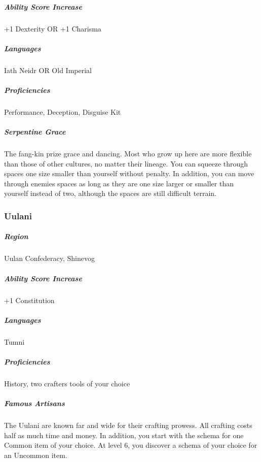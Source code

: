 \subparagraph*{Ability Score Increase} +1 Dexterity OR +1 Charisma

\subparagraph*{Languages} Iath Neidr OR Old Imperial

\subparagraph*{Proficiencies} Performance, Deception, Disguise Kit

\subparagraph*{Serpentine Grace} The fang-kin prize grace and dancing. Most who grow up here are more flexible than those of other cultures, no matter their lineage. You can squeeze through spaces one size smaller than yourself without penalty. In addition, you can move through enemies spaces as long as they are one size larger or smaller than yourself instead of two, although the spaces are still difficult terrain. 

\subsubsection{Uulani}
\subparagraph*{Region} Uulan Confederacy, Shinevog

\subparagraph*{Ability Score Increase} +1 Constitution

\subparagraph*{Languages} Tumni

\subparagraph*{Proficiencies} History, two crafters tools of your choice

\subparagraph*{Famous Artisans} The Uulani are known far and wide for their crafting prowess. All crafting costs half as much time and money. In addition, you start with the schema for one Common item of your choice. At level 6, you discover a schema of your choice for an Uncommon item.